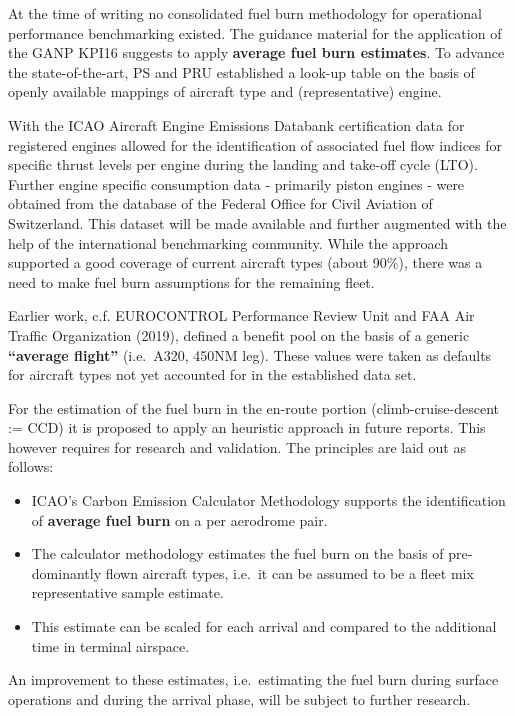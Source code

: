 \documentclass[
  a4paper,
  DIV=11,
  numbers=noendperiod]{scrreprt}
\providecommand{\tightlist}{%
  \setlength{\itemsep}{0pt}\setlength{\parskip}{0pt}}\usepackage{longtable,booktabs,array}
\begin{document}
At the time of writing no consolidated fuel burn methodology for
operational performance benchmarking existed. The guidance material for
the application of the GANP KPI16 suggests to apply \textbf{average fuel
burn estimates}. To advance the state-of-the-art, PS and PRU established
a look-up table on the basis of openly available mappings of aircraft
type and (representative) engine.

With the ICAO Aircraft Engine Emissions Databank certification data for
registered engines allowed for the identification of associated fuel
flow indices for specific thrust levels per engine during the landing
and take-off cycle (LTO). Further engine specific consumption data -
primarily piston engines - were obtained from the database of the
Federal Office for Civil Aviation of Switzerland. This dataset will be
made available and further augmented with the help of the international
benchmarking community. While the approach supported a good coverage of
current aircraft types (about 90\%), there was a need to make fuel burn
assumptions for the remaining fleet.

Earlier work, c.f. EUROCONTROL Performance Review Unit and FAA Air
Traffic Organization (2019), defined a benefit pool on the basis of a
generic \textbf{``average flight''} (i.e.~A320, 450NM leg). These values
were taken as defaults for aircraft types not yet accounted for in the
established data set.

For the estimation of the fuel burn in the en-route portion
(climb-cruise-descent := CCD) it is proposed to apply an heuristic
approach in future reports. This however requires for research and
validation. The principles are laid out as follows:

\begin{itemize}
\tightlist
\item
  ICAO's Carbon Emission Calculator Methodology supports the
  identification of \textbf{average fuel burn} on a per aerodrome pair.
\item
  The calculator methodology estimates the fuel burn on the basis of
  pre-dominantly flown aircraft types, i.e.~it can be assumed to be a
  fleet mix representative sample estimate.
\item
  This estimate can be scaled for each arrival and compared to the
  additional time in terminal airspace.
\end{itemize}

An improvement to these estimates, i.e.~estimating the fuel burn during
surface operations and during the arrival phase, will be subject to
further research.
\end{document}
